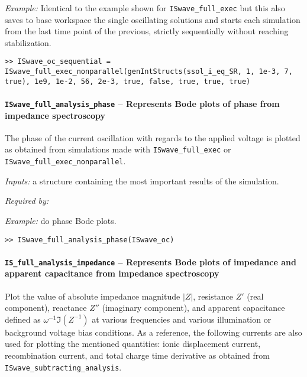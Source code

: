 
	\textit{Example:} Identical to the example shown for \texttt{ISwave\_full\_exec} but this also saves to base workspace the single oscillating solutions and starts each simulation from the last time point of the previous, strictly sequentially without reaching stabilization.
	\begin{lstlisting}[style=Matlab-editor]
>> ISwave_oc_sequential = ISwave_full_exec_nonparallel(genIntStructs(ssol_i_eq_SR, 1, 1e-3, 7, true), 1e9, 1e-2, 56, 2e-3, true, false, true, true, true)
\end{lstlisting}

	\paragraph{\texttt{ISwave\_full\_analysis\_phase} -- Represents Bode plots of phase from impedance spectroscopy}
	The phase of the current oscillation with regards to the applied voltage is plotted as obtained from simulations made with \texttt{ISwave\_full\_exec} or \texttt{ISwave\_full\_exec\_nonparallel}.


	\textit{Inputs:} a structure containing the most important results of the simulation.



	\textit{Required by:}


	\textit{Example:} do phase Bode plots.
	\begin{lstlisting}[style=Matlab-editor]
>> ISwave_full_analysis_phase(ISwave_oc)
				\end{lstlisting}

	\paragraph{\texttt{IS\_full\_analysis\_impedance} -- Represents Bode plots of impedance and apparent capacitance from impedance spectroscopy}
	Plot the value of absolute impedance magnitude $|Z|$, resistance $Z'$ (real component), reactance $Z''$ (imaginary component), and apparent capacitance defined as $\omega^{-1}\Im(Z^{-1})$ at various frequencies and various illumination or background voltage bias conditions.
	As a reference, the following currents are also used for plotting the mentioned quantities: ionic displacement current, recombination current, and total charge time derivative as obtained from \texttt{ISwave\_subtracting\_analysis}.

